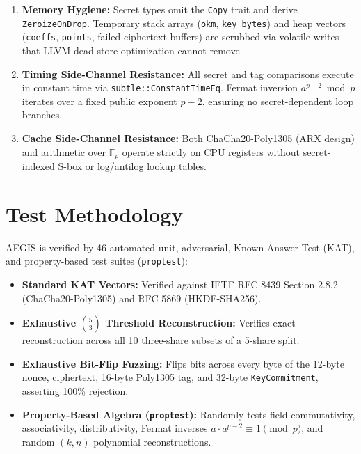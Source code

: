 \documentclass[11pt,a4paper]{article}
\theoremstyle{definition}
\newcommand{\Fp}{\mathbb{F}_p}
\begin{document}
\begin{enumerate}[label=\textbf{\arabic*.}]
    \item \textbf{Memory Hygiene:} Secret types omit the \texttt{Copy} trait and derive \texttt{ZeroizeOnDrop}. Temporary stack arrays (\texttt{okm}, \texttt{key\_bytes}) and heap vectors (\texttt{coeffs}, \texttt{points}, failed ciphertext buffers) are scrubbed via volatile writes that LLVM dead-store optimization cannot remove.
    \item \textbf{Timing Side-Channel Resistance:} All secret and tag comparisons execute in constant time via \texttt{subtle::ConstantTimeEq}. Fermat inversion $a^{p-2} \bmod p$ iterates over a fixed public exponent $p - 2$, ensuring no secret-dependent loop branches.
    \item \textbf{Cache Side-Channel Resistance:} Both ChaCha20-Poly1305 (ARX design) and arithmetic over $\Fp$ operate strictly on CPU registers without secret-indexed S-box or log/antilog lookup tables.
\end{enumerate}

\section{Test Methodology}

AEGIS is verified by 46 automated unit, adversarial, Known-Answer Test (KAT), and property-based test suites (\texttt{proptest}):
\begin{itemize}
    \item \textbf{Standard KAT Vectors:} Verified against IETF RFC 8439 Section 2.8.2 (ChaCha20-Poly1305) and RFC 5869 (HKDF-SHA256).
    \item \textbf{Exhaustive $\binom{5}{3}$ Threshold Reconstruction:} Verifies exact reconstruction across all 10 three-share subsets of a 5-share split.
    \item \textbf{Exhaustive Bit-Flip Fuzzing:} Flips bits across every byte of the 12-byte nonce, ciphertext, 16-byte Poly1305 tag, and 32-byte \texttt{KeyCommitment}, asserting 100\% rejection.
    \item \textbf{Property-Based Algebra (\texttt{proptest}):} Randomly tests field commutativity, associativity, distributivity, Fermat inverses $a \cdot a^{p-2} \equiv 1 \pmod p$, and random $(k,n)$ polynomial reconstructions.
\end{itemize}
\end{document}
